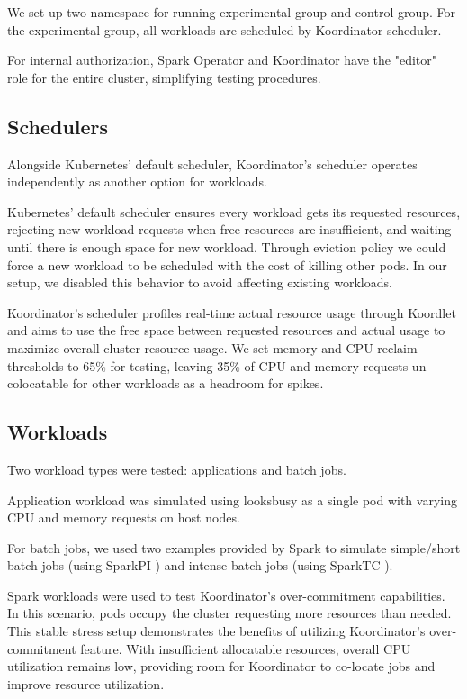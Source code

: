 We set up two namespace for running experimental group and control group. For the experimental group, all workloads are scheduled by Koordinator scheduler.

For internal authorization, Spark Operator and Koordinator have the "editor" role for the entire cluster, simplifying testing procedures.

\subsection{Schedulers}

Alongside Kubernetes' default scheduler, Koordinator's scheduler operates independently as another option for workloads.

Kubernetes' default scheduler ensures every workload gets its requested resources, rejecting new workload requests when free resources are insufficient, and waiting until there is enough space for new workload. Through eviction policy we could force a new workload to be scheduled with the cost of killing other pods. In our setup, we disabled this behavior to avoid affecting existing workloads.

Koordinator's scheduler profiles real-time actual resource usage through Koordlet and aims to use the free space between requested resources and actual usage to maximize overall cluster resource usage. We set memory and CPU reclaim thresholds to 65\% for testing, leaving 35\% of CPU and memory requests un-colocatable for other workloads as a headroom for spikes.

\subsection{Workloads}

Two workload types were tested: applications and batch jobs.

Application workload was simulated using looksbusy \cite{looksbusy} as a single pod with varying CPU and memory requests on host nodes.

For batch jobs, we used two examples provided by Spark to simulate simple/short batch jobs (using SparkPI \cite{sparkexamples}) and intense batch jobs (using SparkTC \cite{sparkexamples}).

Spark workloads were used to test Koordinator's over-commitment capabilities. In this scenario, pods occupy the cluster requesting more resources than needed. This stable stress setup demonstrates the benefits of utilizing Koordinator's over-commitment feature. With insufficient allocatable resources, overall CPU utilization remains low, providing room for Koordinator to co-locate jobs and improve resource utilization.
